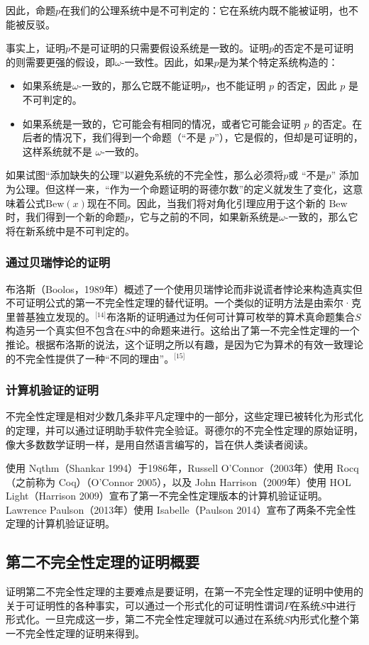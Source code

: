 因此，命题\( p \)在我们的公理系统中是不可判定的：它在系统内既不能被证明，也不能被反驳。

事实上，证明\( p \)不是可证明的只需要假设系统是一致的。证明\( p \)的否定不是可证明的则需要更强的假设，即\( \omega \)-一致性。因此，如果\( p \)是为某个特定系统构造的：
\begin{itemize}
\item 如果系统是\( \omega \)-一致的，那么它既不能证明\( p \)，也不能证明 \( p \) 的否定，因此 \( p \) 是不可判定的。
\item 如果系统是一致的，它可能会有相同的情况，或者它可能会证明 \( p \) 的否定。在后者的情况下，我们得到一个命题（“不是 \( p \)”），它是假的，但却是可证明的，这样系统就不是 \( \omega \)-一致的。
\end{itemize}
如果试图“添加缺失的公理”以避免系统的不完全性，那么必须将\( p \)或 “不是\( p \)” 添加为公理。但这样一来，“作为一个命题证明的哥德尔数”的定义就发生了变化，这意味着公式\( \text{Bew}(x) \)现在不同。因此，当我们将对角化引理应用于这个新的 \( \text{Bew} \)时，我们得到一个新的命题\( p \)，它与之前的不同，如果新系统是\( \omega \)-一致的，那么它将在新系统中是不可判定的。
\subsubsection{通过贝瑞悖论的证明} 
布洛斯（Boolos，1989年）概述了一个使用贝瑞悖论而非说谎者悖论来构造真实但不可证明公式的第一不完全性定理的替代证明。一个类似的证明方法是由索尔·克里普基独立发现的。\(^\text{[14]}\)布洛斯的证明通过为任何可计算可枚举的算术真命题集合\( S \)构造另一个真实但不包含在\( S \)中的命题来进行。这给出了第一不完全性定理的一个推论。根据布洛斯的说法，这个证明之所以有趣，是因为它为算术的有效一致理论的不完全性提供了一种“不同的理由”。\(^\text{[15]}\)
\subsubsection{计算机验证的证明} 
不完全性定理是相对少数几条非平凡定理中的一部分，这些定理已被转化为形式化的定理，并可以通过证明助手软件完全验证。哥德尔的不完全性定理的原始证明，像大多数数学证明一样，是用自然语言编写的，旨在供人类读者阅读。

使用 Nqthm（Shankar 1994）于1986年，Russell O'Connor（2003年）使用 Rocq（之前称为 Coq）（O'Connor 2005），以及 John Harrison（2009年）使用 HOL Light（Harrison 2009）宣布了第一不完全性定理版本的计算机验证证明。Lawrence Paulson（2013年）使用 Isabelle（Paulson 2014）宣布了两条不完全性定理的计算机验证证明。
\subsection{第二不完全性定理的证明概要} 
证明第二不完全性定理的主要难点是要证明，在第一不完全性定理的证明中使用的关于可证明性的各种事实，可以通过一个形式化的可证明性谓词\( P \)在系统\( S \)中进行形式化。一旦完成这一步，第二不完全性定理就可以通过在系统\( S \)内形式化整个第一不完全性定理的证明来得到。

